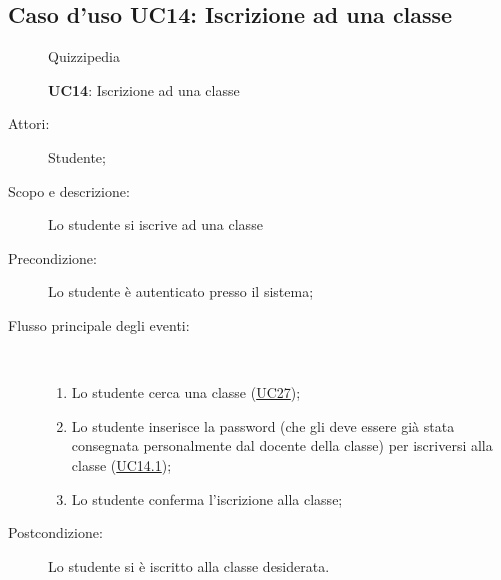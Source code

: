 \subsection{Caso d'uso UC14: Iscrizione ad una classe}
	\begin{figure}[H]
		\centering
		\begin{resizedtikzpicture}{\textwidth}
		\begin{umlsystem}[x=0, fill=lightgray!20]{Quizzipedia}
		\end{umlsystem}
		\end{resizedtikzpicture}
		\caption{\textbf{UC14}: Iscrizione ad una classe}
		\label{UC14}
	\end{figure}
\begin{description}
\item[Attori:] Studente;
\item[Scopo e descrizione:] Lo studente si iscrive ad una classe
      \item[Precondizione:] Lo studente è autenticato presso il sistema;

        \item[Flusso principale degli eventi:] \ 
 \begin{enumerate}
          \item Lo studente cerca una classe (\hyperlink{UC27}{UC27});
          \item Lo studente inserisce la password (che gli deve essere già stata consegnata personalmente dal docente della classe) per iscriversi alla classe (\hyperlink{UC14.1}{UC14.1});
          \item Lo studente conferma l'iscrizione alla classe;

      \end{enumerate}
    \item[Postcondizione:] Lo studente si è iscritto alla classe desiderata.
  \end{description}
\hypertarget{UC14.1}{}
